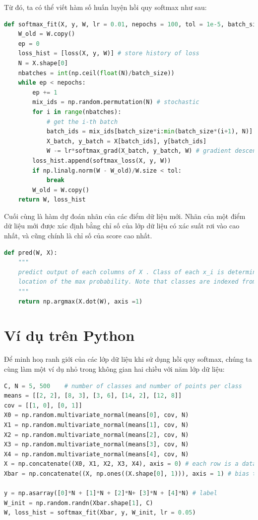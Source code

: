 Từ đó, ta có thể viết hàm số huấn luyện hồi quy softmax như sau:
\begin{lstlisting}[language=Python]
def softmax_fit(X, y, W, lr = 0.01, nepochs = 100, tol = 1e-5, batch_size = 10):
    W_old = W.copy()
    ep = 0 
    loss_hist = [loss(X, y, W)] # store history of loss 
    N = X.shape[0]
    nbatches = int(np.ceil(float(N)/batch_size))
    while ep < nepochs: 
        ep += 1 
        mix_ids = np.random.permutation(N) # stochastic
        for i in range(nbatches):
            # get the i-th batch
            batch_ids = mix_ids[batch_size*i:min(batch_size*(i+1), N)] 
            X_batch, y_batch = X[batch_ids], y[batch_ids]
            W -= lr*softmax_grad(X_batch, y_batch, W) # gradient descent 
        loss_hist.append(softmax_loss(X, y, W))
        if np.linalg.norm(W - W_old)/W.size < tol:
            break 
        W_old = W.copy()
    return W, loss_hist 
\end{lstlisting}
Cuối cùng là hàm dự đoán nhãn của các điểm dữ liệu mới. Nhãn của một điểm dữ
liệu mới được xác định bằng chỉ số của lớp dữ liệu có xác suất rơi vào cao nhất,
và cũng chính là chỉ số của score cao nhất. 
\begin{lstlisting}[language=Python]
def pred(W, X):
    """
    predict output of each columns of X . Class of each x_i is determined by
    location of the max probability. Note that classes are indexed from 0.
    """
    return np.argmax(X.dot(W), axis =1)
\end{lstlisting}

\section{Ví dụ trên Python}
Để minh hoạ ranh giới của các lớp dữ liệu khi sử dụng hồi quy softmax, chúng
ta cùng làm một ví dụ nhỏ trong không gian hai chiều với năm lớp dữ liệu:
\begin{lstlisting}[language=Python]
C, N = 5, 500    # number of classes and number of points per class
means = [[2, 2], [8, 3], [3, 6], [14, 2], [12, 8]]
cov = [[1, 0], [0, 1]]
X0 = np.random.multivariate_normal(means[0], cov, N)
X1 = np.random.multivariate_normal(means[1], cov, N)
X2 = np.random.multivariate_normal(means[2], cov, N)
X3 = np.random.multivariate_normal(means[3], cov, N)
X4 = np.random.multivariate_normal(means[4], cov, N)
X = np.concatenate((X0, X1, X2, X3, X4), axis = 0) # each row is a datapoint
Xbar = np.concatenate((X, np.ones((X.shape[0], 1))), axis = 1) # bias trick 

y = np.asarray([0]*N + [1]*N + [2]*N+ [3]*N + [4]*N) # label 
W_init = np.random.randn(Xbar.shape[1], C)
W, loss_hist = softmax_fit(Xbar, y, W_init, lr = 0.05)
\end{lstlisting}


